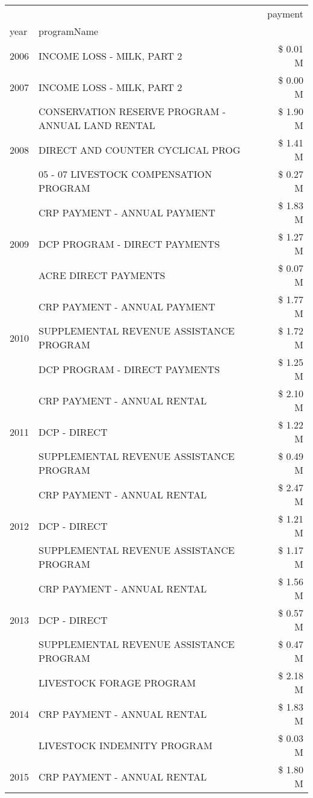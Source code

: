 \begin{tabular}{llr}
\toprule
 &  & payment \\
year & programName &  \\
\midrule
2006 & INCOME LOSS - MILK, PART 2 & \$ 0.01 M \\
\cline{1-3}
2007 & INCOME LOSS - MILK, PART 2 & \$ 0.00 M \\
\cline{1-3}
\multirow[t]{3}{*}{2008} & CONSERVATION RESERVE PROGRAM - ANNUAL LAND RENTAL & \$ 1.90 M \\
 & DIRECT AND COUNTER CYCLICAL PROG & \$ 1.41 M \\
 & 05 - 07 LIVESTOCK COMPENSATION PROGRAM & \$ 0.27 M \\
\cline{1-3}
\multirow[t]{3}{*}{2009} & CRP PAYMENT - ANNUAL PAYMENT & \$ 1.83 M \\
 & DCP PROGRAM - DIRECT PAYMENTS & \$ 1.27 M \\
 & ACRE DIRECT PAYMENTS & \$ 0.07 M \\
\cline{1-3}
\multirow[t]{3}{*}{2010} & CRP PAYMENT - ANNUAL PAYMENT & \$ 1.77 M \\
 & SUPPLEMENTAL REVENUE ASSISTANCE PROGRAM & \$ 1.72 M \\
 & DCP PROGRAM - DIRECT PAYMENTS & \$ 1.25 M \\
\cline{1-3}
\multirow[t]{3}{*}{2011} & CRP PAYMENT - ANNUAL RENTAL & \$ 2.10 M \\
 & DCP - DIRECT & \$ 1.22 M \\
 & SUPPLEMENTAL REVENUE ASSISTANCE PROGRAM & \$ 0.49 M \\
\cline{1-3}
\multirow[t]{3}{*}{2012} & CRP PAYMENT - ANNUAL RENTAL & \$ 2.47 M \\
 & DCP - DIRECT & \$ 1.21 M \\
 & SUPPLEMENTAL REVENUE ASSISTANCE PROGRAM & \$ 1.17 M \\
\cline{1-3}
\multirow[t]{3}{*}{2013} & CRP PAYMENT - ANNUAL RENTAL & \$ 1.56 M \\
 & DCP - DIRECT & \$ 0.57 M \\
 & SUPPLEMENTAL REVENUE ASSISTANCE PROGRAM & \$ 0.47 M \\
\cline{1-3}
\multirow[t]{3}{*}{2014} & LIVESTOCK FORAGE PROGRAM & \$ 2.18 M \\
 & CRP PAYMENT - ANNUAL RENTAL & \$ 1.83 M \\
 & LIVESTOCK INDEMNITY PROGRAM & \$ 0.03 M \\
\cline{1-3}
\multirow[t]{3}{*}{2015} & CRP PAYMENT - ANNUAL RENTAL & \$ 1.80 M \\

\end{tabular}
